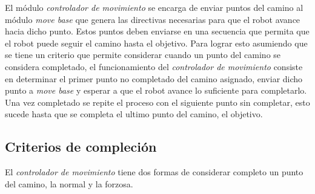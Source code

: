 





El módulo \emph{controlador de movimiento} se encarga de enviar puntos del
camino al módulo \emph{move base} que genera las directivas necesarias para que
el robot avance hacia dicho punto. Estos puntos deben enviarse en una secuencia
que permita que el robot puede seguir el camino hasta el objetivo. Para lograr
esto asumiendo que se tiene un criterio que permite considerar cuando un punto del camino se
considera completado, el funcionamiento del \emph{controlador de
movimiento} consiste en determinar el primer punto no completado del camino
asignado, enviar dicho punto a \emph{move base} y esperar a que el robot avance
lo suficiente para completarlo. Una vez completado se repite el
proceso con el siguiente punto sin completar, esto sucede hasta que se completa
el ultimo punto del camino, el objetivo.


\subsection{Criterios de compleción}

El \emph{controlador de movimiento} tiene dos formas de considerar completo un
punto del camino, la normal y la forzosa.

